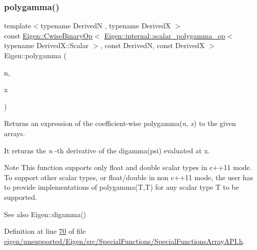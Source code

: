 \subsubsection{\texorpdfstring{polygamma()}{polygamma()}}
{\footnotesize\ttfamily template$<$typename DerivedN , typename DerivedX $>$ \\
const \hyperlink{group___core___module_class_eigen_1_1_cwise_binary_op}{Eigen\+::\+Cwise\+Binary\+Op}$<$ \hyperlink{struct_eigen_1_1internal_1_1scalar__polygamma__op}{Eigen\+::internal\+::scalar\+\_\+polygamma\+\_\+op}$<$ typename Derived\+X\+::\+Scalar $>$, const DerivedN, const DerivedX $>$ Eigen\+::polygamma (\begin{DoxyParamCaption}\item[{const \hyperlink{group___core___module_class_eigen_1_1_array_base}{Eigen\+::\+Array\+Base}$<$ DerivedN $>$ \&}]{n,  }\item[{const \hyperlink{group___core___module_class_eigen_1_1_array_base}{Eigen\+::\+Array\+Base}$<$ DerivedX $>$ \&}]{x }\end{DoxyParamCaption})\hspace{0.3cm}{\ttfamily [inline]}}

\begin{DoxyReturn}{Returns}
an expression of the coefficient-\/wise polygamma({\itshape n}, {\itshape x}) to the given arrays.
\end{DoxyReturn}
It returns the {\itshape n} -\/th derivative of the digamma(psi) evaluated at {\ttfamily x}.

\begin{DoxyNote}{Note}
This function supports only float and double scalar types in c++11 mode. To support other scalar types, or float/double in non c++11 mode, the user has to provide implementations of polygamma(\+T,\+T) for any scalar type T to be supported.
\end{DoxyNote}
\begin{DoxySeeAlso}{See also}
Eigen\+::digamma() 
\end{DoxySeeAlso}


Definition at line \hyperlink{eigen_2unsupported_2_eigen_2src_2_special_functions_2_special_functions_array_a_p_i_8h_source_l00070}{70} of file \hyperlink{eigen_2unsupported_2_eigen_2src_2_special_functions_2_special_functions_array_a_p_i_8h_source}{eigen/unsupported/\+Eigen/src/\+Special\+Functions/\+Special\+Functions\+Array\+A\+P\+I.\+h}.

\mbox{\label{namespace_eigen_afbc3648f7ef67db3d5d04454fc1257fd}} 

